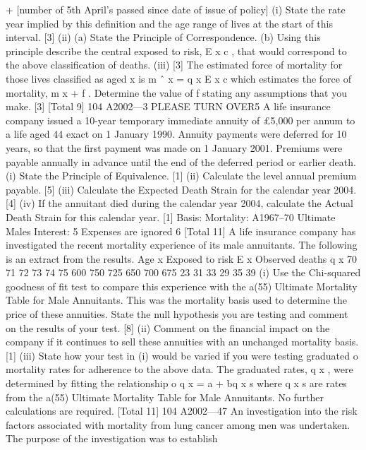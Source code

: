 \documentclass[a4paper,12pt]{article}
\begin{document}
+ [number of 5th April’s passed since date of issue of policy]
(i) State the rate year implied by this definition and the age range of lives at the
start of this interval.
[3]
(ii) (a)
State the Principle of Correspondence.
(b)
Using this principle describe the central exposed to risk, E x c , that
would correspond to the above classification of deaths.
(iii)
[3]
The estimated force of mortality for those lives classified as aged x is
m ˆ x =
q x
E x c
which estimates the force of mortality, m x + f . Determine the value of f stating
any assumptions that you make.
[3]
[Total 9]
104 A2002—3
PLEASE TURN OVER5
A life insurance company issued a 10-year temporary immediate annuity of £5,000
per annum to a life aged 44 exact on 1 January 1990. Annuity payments were
deferred for 10 years, so that the first payment was made on 1 January 2001.
Premiums were payable annually in advance until the end of the deferred period or
earlier death.
(i) State the Principle of Equivalence.
[1]
(ii) Calculate the level annual premium payable.
[5]
(iii) Calculate the Expected Death Strain for the calendar year 2004.
[4]
(iv) If the annuitant died during the calendar year 2004, calculate the Actual Death
Strain for this calendar year.
[1]
Basis: Mortality: A1967–70 Ultimate Males
Interest: 5%
Expenses are ignored
6
[Total 11]
A life insurance company has investigated the recent mortality experience of its male
annuitants. The following is an extract from the results.
Age
x Exposed
to risk
E x Observed
deaths
q x
70
71
72
73
74
75 600
750
725
650
700
675 23
31
33
29
35
39
(i) Use the Chi-squared goodness of fit test to compare this experience with the
a(55) Ultimate Mortality Table for Male Annuitants. This was the mortality
basis used to determine the price of these annuities. State the null hypothesis
you are testing and comment on the results of your test.
[8]
(ii) Comment on the financial impact on the company if it continues to sell these
annuities with an unchanged mortality basis.
[1]
(iii) State how your test in (i) would be varied if you were testing graduated
o
mortality rates for adherence to the above data. The graduated rates, q x , were
determined by fitting the relationship
o
q x = a + bq x s
where q x s are rates from the a(55) Ultimate Mortality Table for Male
Annuitants. No further calculations are required.
[Total 11]
104 A2002—47
An investigation into the risk factors associated with mortality from lung cancer
among men was undertaken. The purpose of the investigation was to establish
\end{document}
